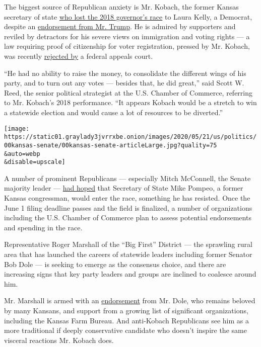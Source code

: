 The biggest source of Republican anxiety is Mr. Kobach, the former
Kansas secretary of state
\href{https://www.nytimes3xbfgragh.onion/2018/11/06/us/laura-kelly-wins-kansas-governors-race.html}{who
lost the 2018 governor's race} to Laura Kelly, a Democrat, despite an
\href{https://www.nytimes3xbfgragh.onion/2018/08/06/us/politics/kris-kobach-trump-kansas.html}{endorsement
from Mr. Trump}. He is admired by supporters and reviled by detractors
for his severe views on immigration and voting rights --- a law
requiring proof of citizenship for voter registration, pressed by Mr.
Kobach, was recently
\href{https://www.nbcnews.com/politics/politics-news/appeals-court-blow-kobach-strikes-down-kansas-law-requiring-proof-n1195511}{rejected
by} a federal appeals court.

``He had no ability to raise the money, to consolidate the different
wings of his party, and to turn out any votes --- besides that, he did
great,'' said Scott W. Reed, the senior political strategist at the U.S.
Chamber of Commerce, referring to Mr. Kobach's 2018 performance. ``It
appears Kobach would be a stretch to win a statewide election and would
cause a lot of resources to be diverted.''

\texttt{[image: https://static01.graylady3jvrrxbe.onion/images/2020/05/21/us/politics/00kansas-senate/00kansas-senate-articleLarge.jpg?quality=75\\\&auto=webp\\\&disable=upscale]}

A number of prominent Republicans --- especially Mitch McConnell, the
Senate majority leader ---
\href{https://www.nytimes3xbfgragh.onion/2020/01/06/us/politics/mike-pompeo-senate-kansas.html}{had
hoped} that Secretary of State Mike Pompeo, a former Kansas congressman,
would enter the race, something he has resisted. Once the June 1 filing
deadline passes and the field is finalized, a number of organizations
including the U.S. Chamber of Commerce plan to assess potential
endorsements and spending in the race.

Representative Roger Marshall of the ``Big First'' District --- the
sprawling rural area that has launched the careers of statewide leaders
including former Senator Bob Dole --- is seeking to emerge as the
consensus choice, and there are increasing signs that key party leaders
and groups are inclined to coalesce around him.

Mr. Marshall is armed with an
\href{https://www.kansascity.com/news/politics-government/article239180118.html}{endorsement}
from Mr. Dole, who remains beloved by many Kansans, and support from a
growing list of significant organizations, including the Kansas Farm
Bureau. And anti-Kobach Republicans see him as a more traditional if
deeply conservative candidate who doesn't inspire the same visceral
reactions Mr. Kobach does.

